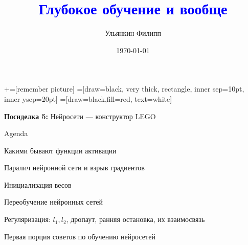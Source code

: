 \documentclass[notes,12pt, aspectratio=169]{beamer}
\title[]{\textcolor{blue}{Глубокое обучение и вообще}}
\author{Ульянкин Филипп}
\date{\today}
\newenvironment{wideitemize}{\itemize\addtolength{\itemsep}{10pt}}{\enditemize}
\begin{document}
\newcommand\marktopleft[1]{%
    \tikz[overlay,remember picture] 
        \node (marker-#1-a) at (-.3em,.3em) {};%
}
\newcommand\markbottomright[2]{%
    \tikz[overlay,remember picture] 
        \node (marker-#1-b) at (0em,0em) {};%
}
+=[remember picture] 
 =[draw=black, very thick, rectangle, inner sep=10pt, inner ysep=20pt]
 =[draw=black,fill=red, text=white]



\begin{frame}
\maketitle
\centering \textbf{\color{blue} Посиделка 5:}  Нейросети — конструктор LEGO
\end{frame}


\begin{frame}{Agenda}
\begin{wideitemize}
	\item  Какими бывают функции активации
	\item  Паралич  нейронной сети и взрыв градиентов 
	\item  Инициализация весов 
	\item  Переобучение нейронных сетей
	\item  Регуляризация: $l_1, l_2$, дропаут, ранняя остановка, их взаимосвязь
	\item  Первая порция советов по обучению нейросетей 	
\end{wideitemize} 
\end{frame}
\end{document}

